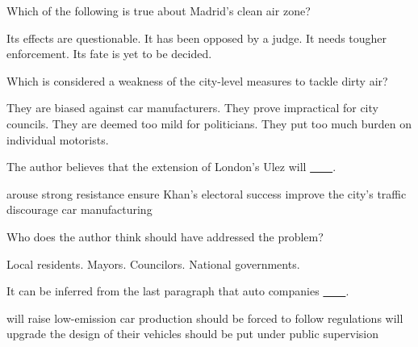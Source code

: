 \item Which of the following is true about Madrid's clean air zone?
\begin{tasks}
	\task Its effects are questionable.
	\task It has been opposed by a judge.
	\task It needs tougher enforcement.
	\task Its fate is yet to be decided.
\end{tasks}
\item Which is considered a weakness of the city-level measures to tackle dirty air?
\begin{tasks}
	\task They are biased against car manufacturers.
	\task They prove impractical for city councils.
	\task They are deemed too mild for politicians.
	\task They put too much burden on individual motorists.
\end{tasks}
\item The author believes that the extension of London's Ulez will \uline{~~~~}.
\begin{tasks}
	\task arouse strong resistance
	\task ensure Khan's electoral success
	\task improve the city's traffic
	\task discourage car manufacturing
\end{tasks}
\item Who does the author think should have addressed the problem?
\begin{tasks}
	\task Local residents.
	\task Mayors.
	\task Councilors.
	\task National governments.
\end{tasks}
\item It can be inferred from the last paragraph that auto companies \uline{~~~~}.
\begin{tasks}
	\task will raise low-emission car production
	\task should be forced to follow regulations
	\task will upgrade the design of their vehicles
	\task should be put under public supervision
\end{tasks}
